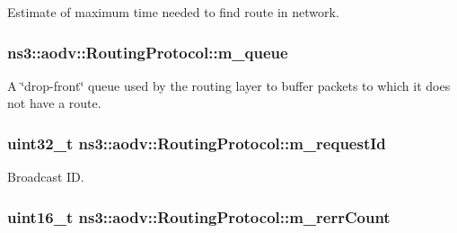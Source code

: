 Estimate of maximum time needed to find route in network. 

\subsubsection[{\texorpdfstring{m\+\_\+queue}{m_queue}}]{ ns3\+::aodv\+::\+Routing\+Protocol\+::m\+\_\+queue\hspace{0.3cm}{\ttfamily [private]}}\hypertarget{classns3_1_1aodv_1_1RoutingProtocol_afd2e6004e54cac8abd2d95cec3ee9580}{}\label{classns3_1_1aodv_1_1RoutingProtocol_afd2e6004e54cac8abd2d95cec3ee9580}


A \char`\"{}drop-\/front\char`\"{} queue used by the routing layer to buffer packets to which it does not have a route. 

\subsubsection[{\texorpdfstring{m\+\_\+request\+Id}{m_requestId}}]{\setlength{\rightskip}{0pt plus 5cm}uint32\+\_\+t ns3\+::aodv\+::\+Routing\+Protocol\+::m\+\_\+request\+Id\hspace{0.3cm}{\ttfamily [private]}}\hypertarget{classns3_1_1aodv_1_1RoutingProtocol_a0075a9d7db2eeb40aaa9066c0a073942}{}\label{classns3_1_1aodv_1_1RoutingProtocol_a0075a9d7db2eeb40aaa9066c0a073942}


Broadcast ID. 

\subsubsection[{\texorpdfstring{m\+\_\+rerr\+Count}{m_rerrCount}}]{\setlength{\rightskip}{0pt plus 5cm}uint16\+\_\+t ns3\+::aodv\+::\+Routing\+Protocol\+::m\+\_\+rerr\+Count\hspace{0.3cm}{\ttfamily [private]}}\hypertarget{classns3_1_1aodv_1_1RoutingProtocol_a4afc71535ffd2ea1bd7dcb03e3fd4233}{}\label{classns3_1_1aodv_1_1RoutingProtocol_a4afc71535ffd2ea1bd7dcb03e3fd4233}



